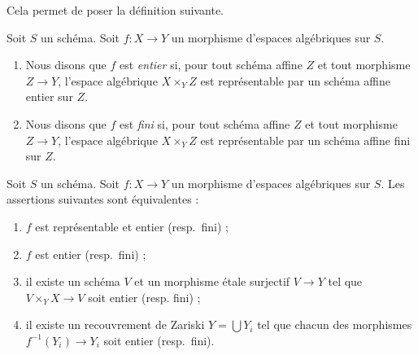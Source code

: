 \noindent
Cela permet de poser la définition suivante.

\begin{definition}
\label{definition-integral}
Soit $S$ un schéma.
Soit $f : X \to Y$ un morphisme d'espaces algébriques sur $S$.
\begin{enumerate}
\item Nous disons que $f$ est {\it entier} si, pour tout schéma affine $Z$
et tout morphisme $Z \to Y$, l'espace algébrique $X \times_Y Z$ est
représentable par un schéma affine entier sur $Z$.
\item Nous disons que $f$ est {\it fini} si, pour tout schéma affine $Z$
et tout morphisme $Z \to Y$, l'espace algébrique $X \times_Y Z$ est
représentable par un schéma affine fini sur $Z$.
\end{enumerate}
\end{definition}

\begin{lemma}
\label{lemma-integral-local}
Soit $S$ un schéma.
Soit $f : X \to Y$ un morphisme d'espaces algébriques sur $S$.
Les assertions suivantes sont équivalentes :
\begin{enumerate}
\item $f$ est représentable et entier (resp.\ fini) ;
\item $f$ est entier (resp.\ fini) ;
\item il existe un schéma $V$ et un morphisme étale surjectif
$V \to Y$ tel que $V \times_Y X \to V$ soit entier (resp. fini) ;
\item il existe un recouvrement de Zariski $Y = \bigcup Y_i$ tel que
chacun des morphismes $f^{-1}(Y_i) \to Y_i$ soit entier (resp.\ fini).
\end{enumerate}
\end{lemma}

